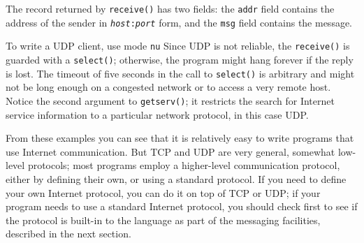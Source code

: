 The record returned by \texttt{receive()} has two fields: the
\texttt{addr} field contains the address of the sender in
\texttt{{\textquotedbl}}\texttt{\textit{host}}\texttt{:}\texttt{\textit{port}}\texttt{{\textquotedbl}}
form, and the \texttt{msg} field contains the message.

To write a UDP client, use mode \texttt{{\textquotedbl}nu{\textquotedbl}}
Since UDP is not reliable, the \texttt{receive()} is guarded
with a \texttt{select()}; otherwise, the program might hang forever if
the reply is lost. The timeout of five seconds in the call to
\texttt{select()} is arbitrary and might not be long enough on a
congested network or to access a very remote host. Notice the second
argument to \texttt{getserv()}; it restricts the search for Internet
service information to a particular network protocol, in this case UDP.


From these examples you can see that it is relatively easy to write
programs that use Internet communication. But TCP and UDP are very
general, somewhat low-level protocols; most programs employ a
higher-level communication protocol, either by defining their own, or
using a standard protocol. If you need to define your own Internet
protocol, you can do it on top of TCP or UDP; if your program needs to
use a standard Internet protocol, you should check first to see if the
protocol is built-in to the language as part of the messaging
facilities, described in the next section.

